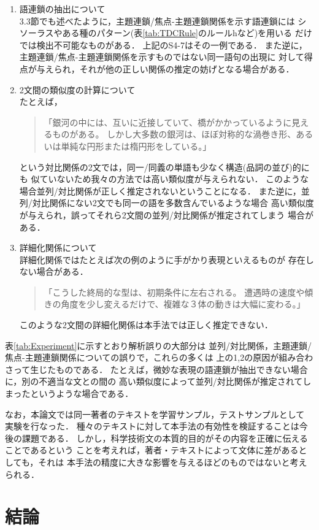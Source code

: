 \begin{enumerate}
\item 語連鎖の抽出について \\
3.3節でも述べたように，主題連鎖/焦点-主題連鎖関係を示す語連鎖には
シソーラスやある種のパターン(表\ref{tab:TDCRule}のルールhなど)を用いる
だけでは検出不可能なものがある．
上記のS4-7はその一例である．
また逆に，主題連鎖/焦点-主題連鎖関係を示すものではない同一語句の出現に
対して得点が与えられ，それが他の正しい関係の推定の妨げとなる場合がある．
\item 2文間の類似度の計算について \\
たとえば，
\begin{quote}
「銀河の中には、互いに近接していて、橋がかかっているように見えるものがある。
しかし大多数の銀河は、ほぼ対称的な渦巻き形、あるいは単純な円形または楕円形をしている。」
\end{quote}
という対比関係の2文では，同一/同義の単語も少なく構造(品詞の並び)的にも
似ていないため我々の方法では高い類似度が与えられない．
このような場合並列/対比関係が正しく推定されないということになる．
また逆に，並列/対比関係にない2文でも同一の語を多数含んでいるような場合
高い類似度が与えられ，誤ってそれら2文間の並列/対比関係が推定されてしまう
場合がある．
\item 詳細化関係について \\
詳細化関係ではたとえば次の例のように手がかり表現といえるものが
存在しない場合がある．
\begin{quote}
「こうした終局的な型は、初期条件に左右される。
遭遇時の速度や傾きの角度を少し変えるだけで、複雑な３体の動きは大幅に変わる。」
\end{quote}
このような2文間の詳細化関係は本手法では正しく推定できない．
\end{enumerate}
表\ref{tab:Experiment}に示すとおり解析誤りの大部分は
並列/対比関係，主題連鎖/焦点-主題連鎖関係についての誤りで，これらの多くは
上の1,2の原因が組み合わさって生じたものである．
たとえば，微妙な表現の語連鎖が抽出できない場合に，別の不適当な文との間の
高い類似度によって並列/対比関係が推定されてしまったというような場合である．

なお，本論文では同一著者のテキストを学習サンプル，テストサンプルとして
実験を行なった．
種々のテキストに対して本手法の有効性を検証することは今後の課題である．
しかし，科学技術文の本質的目的がその内容を正確に伝えることであるという
ことを考えれば，著者・テキストによって文体に差があるとしても，それは
本手法の精度に大きな影響を与えるほどのものではないと考えられる．

\section{結論}

